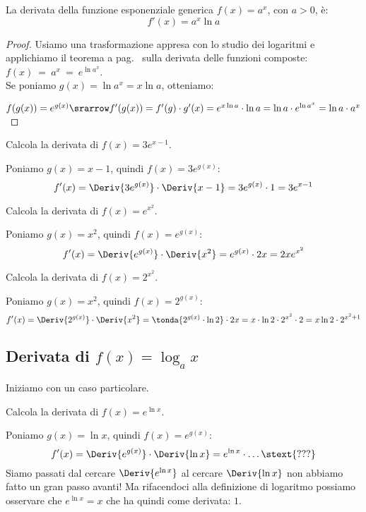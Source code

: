 \begin{teorema}
  La derivata della funzione esponenziale generica \(f(x)=a^x\), con 
\(a>0\), è:\\ 
\[f'(x)= a^x\ln{a}\]
\end{teorema}
\begin{proof}
Usiamo una trasformazione appresa con lo studio dei logaritmi e applichiamo 
il teorema a pag.~\pageref{teo:diff01_dericomp} sulla derivata delle funzioni 
composte:
\(f(x)~=~a^x~=~e^{\ln a^x}\). \\
Se poniamo \(g(x)=\ln a^x=x\ln a\), otteniamo:

\(f(g(x))=e^{g(x)} \srarrow f'(g(x))=f'(g) \cdot g'(x) = 
e^{x\ln a} \cdot \ln a = \ln a \cdot e^{\ln a^x} = \ln a \cdot a^x\)
\end{proof}
\begin{esempio}
Calcola la derivata di \(f(x)=3e^{x-1}\).

Poniamo \(g(x)=x-1\), quindi \(f(x) = 3e^{g(x)}\): 
\[f'(x) = \Deriv{3e^{g(x)}} \cdot \Deriv{x-1} = 
          3e^{g(x)} \cdot 1 = 3e^{x-1}\]
\end{esempio}
\begin{esempio}
Calcola la derivata di \(f(x)=e^{x^2}\).

Poniamo \(g(x)=x^2\), quindi \(f(x)=e^{g(x)}\): 
\[f'(x) = \Deriv{e^{g(x)}} \cdot \Deriv{x^2} = 
          e^{g(x)} \cdot 2x = 2xe^{x^2}\]
\end{esempio}

\begin{esempio}
Calcola la derivata di \(f(x)=2^{x^2}\).

Poniamo \(g(x)=x^2\), quindi \(f(x)=2^{g(x)}\): 
\[f'(x) = \Deriv{2^{g(x)}} \cdot \Deriv{x^2} = 
          \tonda{2^{g(x)} \cdot \ln 2} \cdot 2x = 
          x \cdot \ln 2 \cdot 2^{x^2} \cdot 2 = 
          x \ln 2 \cdot 2^{x^2+1}\]
\end{esempio}

\subsection{Derivata di \(f(x)=\log_a x\)}
\label{}

Iniziamo con un caso particolare.
\begin{esempio}
Calcola la derivata di \(f(x)=e^{\ln x}\).

Poniamo \(g(x)=\ln x\), quindi \(f(x)=e^{g(x)}\): 
\[f'(x) = \Deriv{e^{g(x)}} \cdot \Deriv{\ln x} = 
e^{\ln x} \cdot \dots \stext{???}\]
Siamo passati dal cercare \(\Deriv{e^{\ln x}}\) al cercare 
\(\Deriv{\ln x}\) non abbiamo fatto un gran passo avanti!
Ma rifacendoci alla definizione di logaritmo possiamo osservare che 
\(e^{\ln x} = x\) che ha quindi come derivata: \(1\).
\end{esempio}

